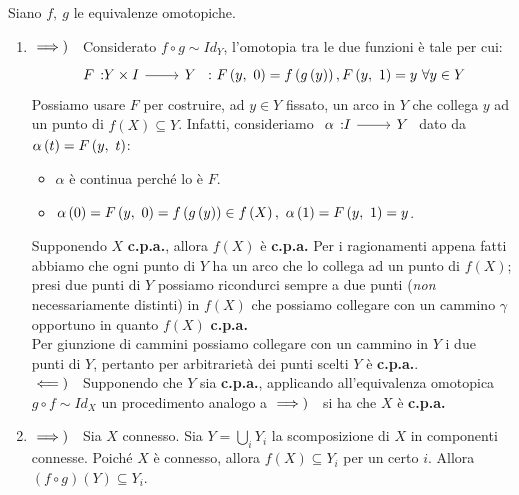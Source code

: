 \begin{demonstration} Siano $f,\ g$ le equivalenze omotopiche.
	\begin{center}
	\end{center}
	\begin{enumerate}[label=\Roman*]
		\item 
$\implies)\quad$Considerato $f\circ g\sim Id_Y$, l'omotopia tra le due funzioni è tale per cui:
\begin{equation*}
	\funz{F}{Y\times I}{Y}\ \colon \mvf{F}{y}{0}=f\left(g\left(y\right)\right), \mvf{F}{y}{1}=y\ \forall y\in Y
\end{equation*}
Possiamo usare $F$ per costruire, ad $y\in Y$ fissato, un arco in $Y$ che collega $y$ ad un punto di $f\left(X\right)\subseteq Y$. Infatti, consideriamo $\funz{\alpha}{I}{Y}$ dato da $\alpha\left(t\right)=F\left(y,\ t\right)$:
\begin{itemize}
	\item $\alpha$ è continua perché lo è $F$.
	\item $\alpha\left(0\right)=F\left(y,\ 0\right)=f\left(g\left(y\right)\right)\in f\left(X\right),\ \alpha\left(1\right)=F\left(y,\ 1\right)=y$.
\end{itemize}
Supponendo $X$ \textbf{c.p.a.}, allora $f\left(X\right)$ è \textbf{c.p.a.} Per i ragionamenti appena fatti abbiamo che ogni punto di $Y$ ha un arco che lo collega ad un punto di $f\left(X\right)$; presi due punti di $Y$ possiamo ricondurci sempre a due punti (\textit{non} necessariamente distinti) in $f\left(X\right)$ che possiamo collegare con un cammino $\gamma$ opportuno in quanto $f\left(X\right)$ \textbf{c.p.a.}\\
Per giunzione di cammini possiamo collegare con un cammino in $Y$ i due punti di $Y$, pertanto per arbitrarietà dei punti scelti $Y$ è \textbf{c.p.a.}.\\
$\impliedby)\quad$Supponendo che $Y$ sia \textbf{c.p.a.}, applicando all'equivalenza omotopica $g\circ f\sim Id_X$ un procedimento analogo a $\implies)\quad$si ha che $X$ è \textbf{c.p.a.}
\item $\implies)\quad$Sia $X$ connesso. Sia $Y=\bigcup_i Y_i$ la scomposizione di $X$ in componenti connesse. Poiché $X$ è connesso, allora $f\left(X\right)\subseteq Y_i$ per un certo $i$. Allora $\left(f\circ g\right)\left(Y\right)\subseteq Y_i$.\\

\end{enumerate}
\end{demonstration}
